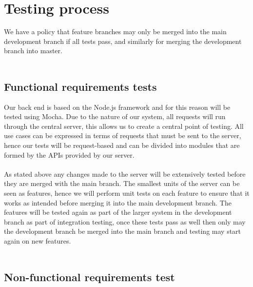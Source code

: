 \documentclass{article}
\begin{document}
\section{Testing process}
We have a policy that feature branches may only be merged into the main development branch if all tests pass, and similarly for merging the development branch into master. 
\\ \\
\subsection*{Functional requirements tests}
Our back end is based on the Node.js framework and for this reason will be tested using Mocha. Due to the nature of our system, all requests will run through the central server, this allows us to create a central point of testing. All use cases can be expressed in terms of requests that must be sent to the server, hence our tests will be request-based and can be divided into modules that are formed by the APIs provided by our server.
\\ \\
As stated above any changes made to the server will be extensively tested before they are merged with the main branch. The smallest units of the server can be seen as features, hence we will perform unit tests on each feature to ensure that it works as intended before merging it into the main development branch. The features will be tested again as part of the larger system in the development branch as part of integration testing, once these tests pass as well then only may the development branch be merged into the main branch and testing may start again on new features.
\\ \\
\subsection*{Non-functional requirements test}
\end{document}
